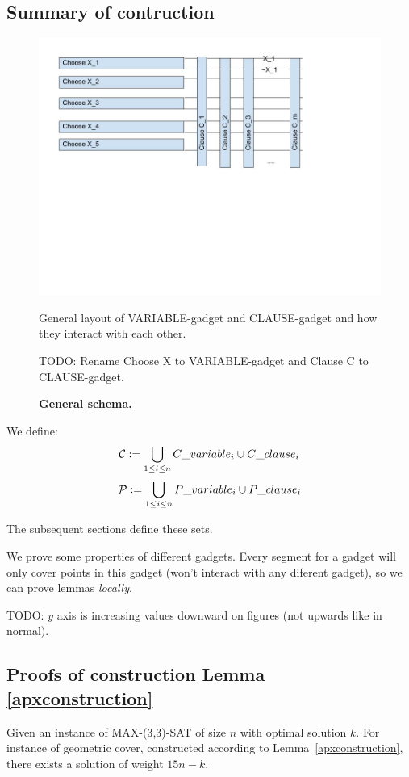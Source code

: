 \subsection{Summary of contruction}

\begin{figure}
\centering
\includegraphics[width=\linewidth]{segment_apx_sketch.jpg}
\caption{\textbf{General schema.}}
General layout of VARIABLE-gadget and CLAUSE-gadget and how they
interact with each other.

TODO: Rename Choose X to VARIABLE-gadget and Clause C to CLAUSE-gadget.
\label{fig:segment_apx_sketch}
\end{figure}

We define:
$$\mathcal{C} := \bigcup_{1 \le i \le n} C\_variable_i \cup C\_clause_i $$
$$\mathcal{P} := \bigcup_{1 \le i \le n} P\_variable_i \cup P\_clause_i $$

The subsequent sections define these sets.

We prove some properties of different gadgets.
Every segment for a gadget will only cover points 
in this gadget (won't interact with any diferent gadget),
so we can prove lemmas \textit{locally}.


TODO: $y$ axis is increasing values downward on figures
(not upwards like in normal).

\subsection{Proofs of construction Lemma \ref{apxconstruction}}
\begin{lemma}
	\label{construction_correctness}
	Given an instance of MAX-(3,3)-SAT of size $n$
	with optimal solution $k$.
	For instance of geometric cover, constructed
	according to Lemma~\ref{apxconstruction}, 
	there exists a solution of weight $15n - k$.
\end{lemma}

